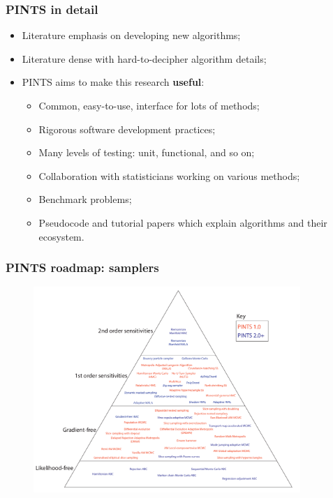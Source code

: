 \documentclass[handout]{beamer}
\begin{document}
\begin{frame}
\frametitle{PINTS in detail}

\begin{itemize}
	\item Literature emphasis on developing new algorithms;
	\item Literature dense with hard-to-decipher algorithm details;
	\item PINTS aims to make this research \textbf{useful}:
	\begin{itemize}
		\item Common, easy-to-use, interface for lots of methods;
		\item Rigorous software development practices;
		\item Many levels of testing: unit, functional, and so on;
		\item Collaboration with statisticians working on various methods;
		\item Benchmark problems;
		\item Pseudocode and tutorial papers which explain algorithms and their ecosystem.
	\end{itemize} 
\end{itemize}

\end{frame}

\begin{frame}
\frametitle{PINTS roadmap: samplers}

\begin{figure}
	\centerline{\includegraphics[width=0.9\textwidth]{./Figures/pints-roadmap-triangle-more-samplers.pdf}}
\end{figure}

\end{frame}
\end{document}
